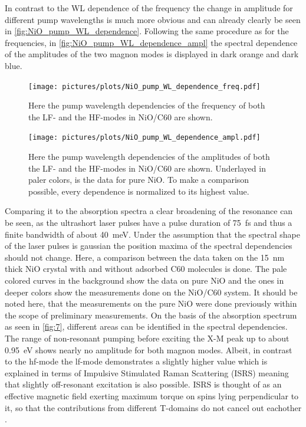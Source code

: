\FloatBarrier
In contrast to the WL dependence of the frequency the change in amplitude for different pump wavelengths is much more obvious and can already clearly be seen in \autoref{fig:NiO_pump_WL_dependence}.
Following the same procedure as for the frequencies, in \autoref{fig:NiO_pump_WL_dependence_ampl} the spectral dependence of the amplitudes of the two magnon modes is displayed in dark orange and dark blue.
\begin{figure}[ht]
    \centering
    \texttt{[image: pictures/plots/NiO\_pump\_WL\_dependence\_freq.pdf]}
    \caption{Here the pump wavelength dependencies of the frequency of both the LF- and the HF-modes in NiO/C60 are shown.}
    \label{fig:NiO_pump_WL_dependence_freq}
\end{figure}
\begin{figure}[ht]
    \centering
    \texttt{[image: pictures/plots/NiO\_pump\_WL\_dependence\_ampl.pdf]}
    \caption{Here the pump wavelength dependencies of the amplitudes of both the LF- and the HF-modes in NiO/C60 are shown. Underlayed in paler colors, is the data for pure NiO. To make a comparison possible, every dependence is normalized to its highest value.}
    \label{fig:NiO_pump_WL_dependence_ampl}
\end{figure}
\FloatBarrier
Comparing it to the absorption spectra a clear broadening of the resonance can be seen, as the ultrashort laser pulses have a pulse duration of \qty{75}{fs} and thus a finite bandwidth of about \qty{40}{meV}.
Under the assumption that the spectral shape of the laser pulses is gaussian the position maxima of the spectral dependencies should not change.
Here, a comparison between the data taken on the \qty{15}{nm} thick NiO crystal with and without adsorbed C60 molecules is done.
The pale colored curves in the background show the data on pure NiO and the ones in deeper colors show the measurements done on the NiO/C60 system.
It should be noted here, that the measurements on the pure NiO were done previously within the scope of preliminary measurements.
On the basis of the absorption spectrum as seen in \autoref{fig:7}, different areas can be identified in the spectral dependencies.
The range of non-resonant pumping before exciting the X-M peak up to about \qty{0.95}{eV} shows nearly no amplitude for both magnon modes.
Albeit, in contrast to the hf-mode the lf-mode demonstrates a slightly higher value which is explained in terms of Impulsive Stimulated Raman Scattering (ISRS)  meaning that slightly off-resonant excitation is also possible.
ISRS is thought of as an effective magnetic field exerting maximum torque on spins lying perpendicular to it, so that the contributions from different T-domains do not cancel out eachother .
